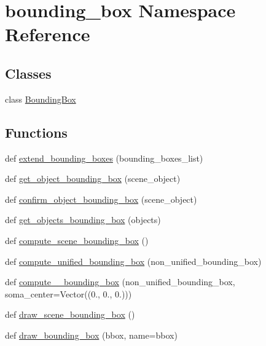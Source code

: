 \hypertarget{namespacebounding__box}{}\section{bounding\+\_\+box Namespace Reference}
\label{namespacebounding__box}
\subsection*{Classes}
\begin{DoxyCompactItemize}
\item 
class \hyperlink{classbounding__box_1_1BoundingBox}{Bounding\+Box}
\end{DoxyCompactItemize}
\subsection*{Functions}
\begin{DoxyCompactItemize}
\item 
def \hyperlink{namespacebounding__box_a211a6c507dd246716acd926c51f80426}{extend\+\_\+bounding\+\_\+boxes} (bounding\+\_\+boxes\+\_\+list)
\item 
def \hyperlink{namespacebounding__box_a701f252ba9b0cdf7beb5089c5d1abb48}{get\+\_\+object\+\_\+bounding\+\_\+box} (scene\+\_\+object)
\item 
def \hyperlink{namespacebounding__box_a59677989438e4f0b8fc7e3e0ee33d0e9}{confirm\+\_\+object\+\_\+bounding\+\_\+box} (scene\+\_\+object)
\item 
def \hyperlink{namespacebounding__box_a386a4a01e9815459b46561a9a7fa37e6}{get\+\_\+objects\+\_\+bounding\+\_\+box} (objects)
\item 
def \hyperlink{namespacebounding__box_a1241536043cc4017fa4bad82ff630831}{compute\+\_\+scene\+\_\+bounding\+\_\+box} ()
\item 
def \hyperlink{namespacebounding__box_aed3b5a6427389e03fae2d2ae9aef1775}{compute\+\_\+unified\+\_\+bounding\+\_\+box} (non\+\_\+unified\+\_\+bounding\+\_\+box)
\item 
def \hyperlink{namespacebounding__box_a6f95c5fb0d6bcbe57401372f4a645095}{compute\+\_\+\_\+bounding\+\_\+box} (non\+\_\+unified\+\_\+bounding\+\_\+box, soma\+\_\+center=Vector((0., 0., 0.)))
\item 
def \hyperlink{namespacebounding__box_a9f83d852bf403b8ecd32ad1146fd3e64}{draw\+\_\+scene\+\_\+bounding\+\_\+box} ()
\item 
def \hyperlink{namespacebounding__box_ad858b7a625dace4e34711aee5d0eed5b}{draw\+\_\+bounding\+\_\+box} (bbox, name=\textquotesingle{}bbox\textquotesingle{})
\end{DoxyCompactItemize}


